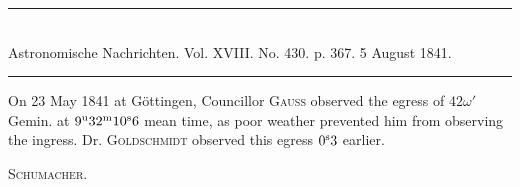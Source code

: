 \clearpage
\hypertarget{native-469-occultation}{}
\begin{center}
\rule{0.55\linewidth}{0.4pt}\\[2pt]
Astronomische Nachrichten. Vol. XVIII. No. 430. p. 367. 5 August 1841.\\[2pt]
\rule{0.55\linewidth}{0.4pt}
\end{center}

On 23 May 1841 at Göttingen, Councillor \textsc{Gauss} observed the egress of $42\omega'$ Gemin. at $9^{\rm u}32^{\rm m}10^{\rm s}6$ mean time, as poor weather prevented him from observing the ingress. Dr. \textsc{Goldschmidt} observed this egress $0^{\rm s}3$ earlier.
\begin{flushright}\textsc{Schumacher.}\end{flushright}

